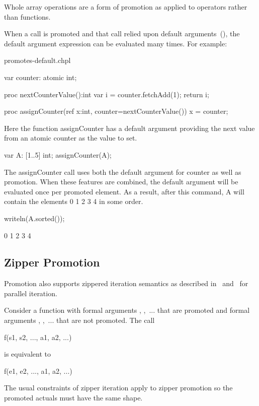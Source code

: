 Whole array operations are a form of promotion as applied to operators
rather than functions.

When a call is promoted and that call relied upon default
arguments~(), the default argument expression can
be evaluated many times. For example:

\begin{chapelexample}{promotes-default.chpl}
\begin{chapel}
  var counter: atomic int;

  proc nextCounterValue():int {
    var i = counter.fetchAdd(1);
    return i;
  }

  proc assignCounter(ref x:int, counter=nextCounterValue()) {
    x = counter;
  }
\end{chapel}

Here the function assignCounter has a default argument
providing the next value from an atomic counter as the value to set.

\begin{chapel}
  var A: [1..5] int;
  assignCounter(A);
\end{chapel}

The assignCounter call uses both the default argument for counter as well
as promotion. When these features are combined, the default argument
will be evaluated once per promoted element. As a result, after this
command, A will contain the elements 0 1 2 3 4 in some order.

\begin{chapelnoprint}
writeln(A.sorted());
\end{chapelnoprint}
\begin{chapeloutput}
0 1 2 3 4
\end{chapeloutput}
\end{chapelexample}



\subsection{Zipper Promotion}
\label{Zipper_Promotion}

Promotion also supports zippered iteration semantics as described
in~ and~ for parallel
iteration.

Consider a function  with formal
arguments , ,~... that are promoted and formal
arguments , ,~... that are not promoted.  The call
\begin{chapel}
f(s1, s2, ..., a1, a2, ...)
\end{chapel}
is equivalent to
\begin{chapel}
[(e1, e2, ...) in zip(s1, s2, ...)] f(e1, e2, ..., a1, a2, ...)
\end{chapel}
The usual constraints of zipper iteration apply to zipper promotion so
the promoted actuals must have the same shape.

